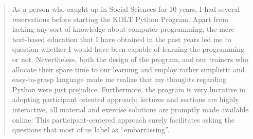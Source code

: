 \begin{frame}
\begin{columns}
\begin{column}{0.7\textwidth}
            \begin{quote}
              As a person who caught up in Social Sciences for 10 years, I had several reservations before starting the KOLT Python Program. Apart from lacking any sort of knowledge about computer programming, the mere text-based education that I have obtained in the past years led me to question whether I would have been capable of learning the programming or not. Nevertheless, both the design of the program, and our trainers who allocate their spare time to our learning and employ rather simplistic and easy-to-grasp language made me realize that my thoughts regarding Python were just prejudice. Furthermore, the program is very lucrative in adopting participant oriented approach; lectures and sections are highly interactive, all material and exercise solutions are promptly made available online. This participant-centered approach surely facilitates asking the questions that most of us label as “embarrassing”.                          
            \end{quote}
          \end{column}
        \end{columns}
      \end{frame}

